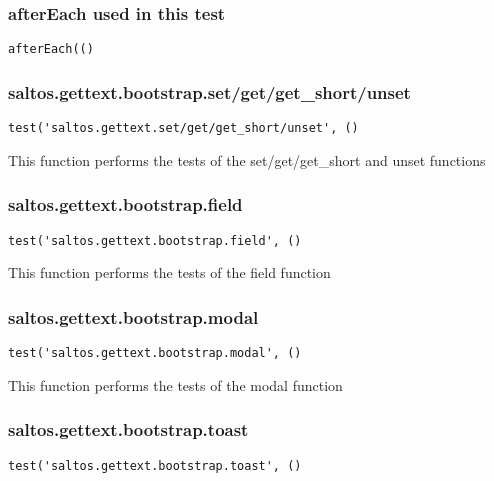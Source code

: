 \documentclass[a4paper]{article}
\begin{document}
\hypertarget{toc181}{}
\subsubsection{afterEach used in this test}

\begin{lstlisting}
afterEach(()
\end{lstlisting}

\hypertarget{toc182}{}
\subsubsection{saltos.gettext.bootstrap.set/get/get\_short/unset}

\begin{lstlisting}
test('saltos.gettext.set/get/get_short/unset', ()
\end{lstlisting}

This function performs the tests of the set/get/get\_short and unset functions

\hypertarget{toc183}{}
\subsubsection{saltos.gettext.bootstrap.field}

\begin{lstlisting}
test('saltos.gettext.bootstrap.field', ()
\end{lstlisting}

This function performs the tests of the field function

\hypertarget{toc184}{}
\subsubsection{saltos.gettext.bootstrap.modal}

\begin{lstlisting}
test('saltos.gettext.bootstrap.modal', ()
\end{lstlisting}

This function performs the tests of the modal function

\hypertarget{toc185}{}
\subsubsection{saltos.gettext.bootstrap.toast}

\begin{lstlisting}
test('saltos.gettext.bootstrap.toast', ()
\end{lstlisting}
\end{document}
